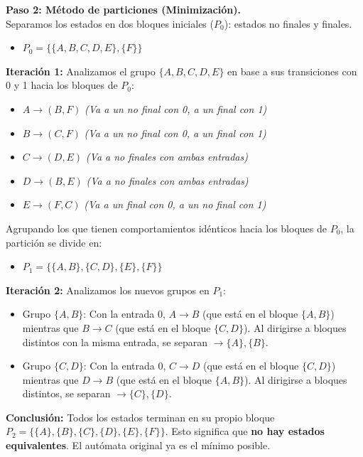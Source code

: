 \documentclass[12pt]{article}
\begin{document}
\vspace{0.3cm}

\textbf{Paso 2: Método de particiones (Minimización).} \\
Separamos los estados en dos bloques iniciales ($P_0$): estados no finales y finales.
\begin{itemize}
    \item $P_0 = \{ \{A, B, C, D, E\}, \{F\} \}$
\end{itemize}

\textbf{Iteración 1:} Analizamos el grupo $\{A, B, C, D, E\}$ en base a sus transiciones con 0 y 1 hacia los bloques de $P_0$:
\begin{itemize}
    \item $A \rightarrow (B, F)$ \textit{(Va a un no final con 0, a un final con 1)}
    \item $B \rightarrow (C, F)$ \textit{(Va a un no final con 0, a un final con 1)}
    \item $C \rightarrow (D, E)$ \textit{(Va a no finales con ambas entradas)}
    \item $D \rightarrow (B, E)$ \textit{(Va a no finales con ambas entradas)}
    \item $E \rightarrow (F, C)$ \textit{(Va a un final con 0, a un no final con 1)}
\end{itemize}
Agrupando los que tienen comportamientos idénticos hacia los bloques de $P_0$, la partición se divide en:
\begin{itemize}
    \item $P_1 = \{ \{A, B\}, \{C, D\}, \{E\}, \{F\} \}$
\end{itemize}

\textbf{Iteración 2:} Analizamos los nuevos grupos en $P_1$:
\begin{itemize}
    \item Grupo $\{A, B\}$: Con la entrada 0, $A \rightarrow B$ (que está en el bloque $\{A,B\}$) mientras que $B \rightarrow C$ (que está en el bloque $\{C,D\}$). Al dirigirse a bloques distintos con la misma entrada, se separan $\rightarrow \{A\}, \{B\}$.
    \item Grupo $\{C, D\}$: Con la entrada 0, $C \rightarrow D$ (que está en el bloque $\{C,D\}$) mientras que $D \rightarrow B$ (que está en el bloque $\{A,B\}$). Al dirigirse a bloques distintos, se separan $\rightarrow \{C\}, \{D\}$.
\end{itemize}
\textbf{Conclusión:} Todos los estados terminan en su propio bloque $P_2 = \{ \{A\}, \{B\}, \{C\}, \{D\}, \{E\}, \{F\} \}$. Esto significa que \textbf{no hay estados equivalentes}. El autómata original ya es el mínimo posible.
\end{document}
